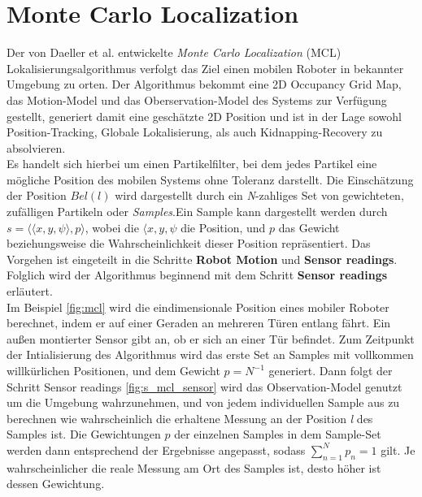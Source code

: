 \section{Monte Carlo Localization}\label{sec:mcl}
Der von Daeller et al. \cite{Monte-Carlo-Localization} entwickelte \textit{Monte Carlo Localization} (MCL) Lokalisierungsalgorithmus verfolgt das Ziel einen mobilen Roboter in bekannter Umgebung zu orten. Der Algorithmus bekommt eine 2D Occupancy Grid Map, das Motion-Model und das Oberservation-Model des Systems zur Verfügung gestellt, generiert damit eine geschätzte 2D Position und ist in der Lage sowohl Position-Tracking, Globale Lokalisierung, als auch Kidnapping-Recovery zu absolvieren. \\
Es handelt sich hierbei um einen Partikelfilter, bei dem jedes Partikel eine mögliche Position des mobilen Systems ohne Toleranz darstellt. Die Einschätzung der Position $Bel(l)$ wird dargestellt durch ein \textit{N}-zahliges Set von gewichteten, zufälligen Partikeln oder \textit{Samples}.Ein Sample kann dargestellt werden durch $s=\langle\langle x,y,\psi \rangle,p\rangle$, wobei die $\langle x,y,\psi$ die Position, und $p$ das Gewicht beziehungsweise die Wahrscheinlichkeit dieser Position repräsentiert. Das Vorgehen ist eingeteilt in die Schritte \textbf{Robot Motion} und \textbf{Sensor readings}. Folglich wird der Algorithmus beginnend mit dem Schritt \textbf{Sensor readings} erläutert.\\
Im Beispiel \ref{fig:mcl} wird die eindimensionale Position eines mobiler Roboter berechnet, indem er auf einer Geraden an mehreren Türen entlang fährt. Ein außen montierter Sensor gibt an, ob er sich an einer Tür befindet. Zum Zeitpunkt der Intialisierung des Algorithmus wird das erste Set an Samples mit vollkommen willkürlichen Positionen, und dem Gewicht $p=N^{-1}$ generiert. Dann folgt der Schritt Sensor readings \ref{fig:s_mcl_sensor} wird das Observation-Model genutzt um die Umgebung wahrzunehmen, und von jedem individuellen Sample aus zu berechnen wie wahrscheinlich die erhaltene Messung an der Position \textit{l} des Samples ist. Die Gewichtungen $p$ der einzelnen Samples in dem Sample-Set werden dann entsprechend der Ergebnisse angepasst, sodass $\sum_{n=1}^{N} p_n =1$ gilt. Je wahrscheinlicher die reale Messung am Ort des Samples ist, desto höher ist dessen Gewichtung.\\
